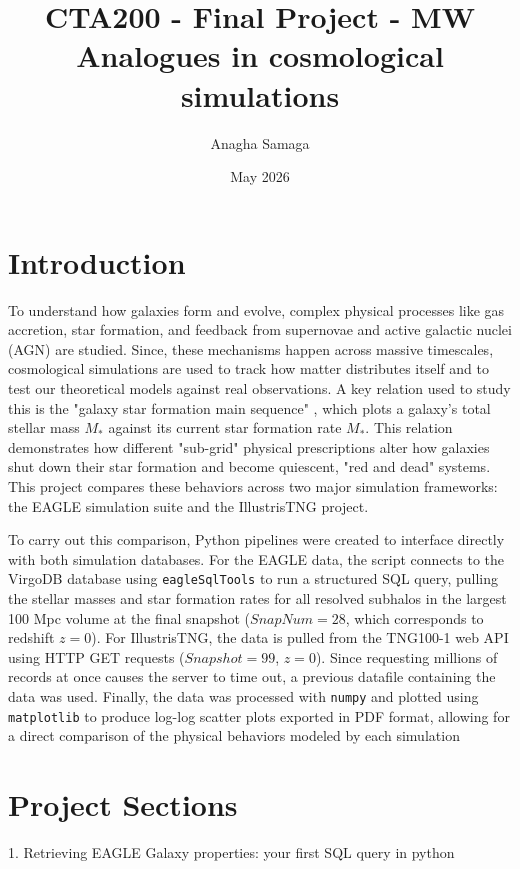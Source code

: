 \documentclass{article}
\title{CTA200 - Final Project - MW Analogues in cosmological simulations}
\author{Anagha Samaga}
\date{May 2026}
\begin{document}
\maketitle
\newpage

\section{ Introduction}

To understand how galaxies form and evolve,  complex physical processes like gas accretion, star formation, and feedback from supernovae and active galactic nuclei (AGN) are studied. Since, these mechanisms happen across massive timescales, cosmological  simulations are used to track how matter distributes itself and to test our theoretical models against real observations. A key relation  used to study this is the "galaxy star formation main sequence" , which plots a galaxy's total stellar mass $M_*$ against its current star formation rate $M_*$. This  relation demonstrates  how different "sub-grid" physical prescriptions alter how galaxies shut down their star formation and become quiescent, "red and dead" systems. This project compares these behaviors across two major simulation frameworks: the EAGLE simulation suite and the IllustrisTNG project.

To carry out this comparison, Python pipelines were created to interface directly with both simulation databases. For the EAGLE data, the script connects to the VirgoDB database using \verb|eagleSqlTools| to run a structured SQL query, pulling the stellar masses and star formation rates for all resolved subhalos in the largest 100 Mpc volume at the final snapshot ($SnapNum = 28$, which corresponds to redshift $z=0$). For IllustrisTNG, the data is pulled from the TNG100-1 web API using HTTP GET requests ($Snapshot = 99$, $z=0$). Since requesting millions of records at once causes the server to time out, a previous datafile containing the data was used. Finally, the data was processed with \verb|numpy| and plotted using \verb|matplotlib| to produce log-log scatter plots exported in PDF format, allowing for a direct comparison of the physical behaviors modeled by each simulation 

\newpage
\section{Project Sections}

1. Retrieving EAGLE Galaxy properties: your first SQL query in python
\end{document}
